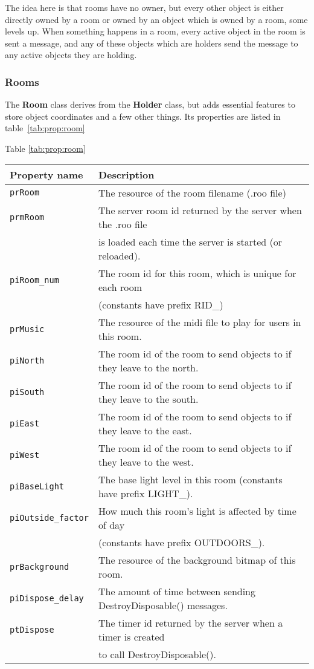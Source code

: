 \documentclass[12pt]{article}
\newcommand{\class}[1]{\textbf{#1}}
\newcommand{\prop}[1]{\texttt{#1}}
\begin{document}
The idea here is that rooms have no owner, but every other object is
either directly owned by a room or owned by an object which is owned
by a room, some levels up.  When something happens in a room, every
active object in the room is sent a message, and any of these objects
which are holders send the message to any active objects they are holding.

\subsubsection{Rooms}

The \class{Room} class derives from the \class{Holder} class, but adds
essential features to store object coordinates and a few other things.
Its properties are listed in table~\ref{tab:prop:room}
\begin{center}
Table \ref{tab:prop:room}
\begin{tabular}{||l|l||} \hline
Property name & Description 
\\ \hline \hline
\prop{prRoom} &  The resource of the room filename (.roo file)
\\ \hline
\prop{prmRoom} &  The server room id  returned by the server when the .roo
file \\
               &  is loaded each time the server is started (or reloaded).
\\ \hline
\prop{piRoom\_num} &  The room id for this room, which is unique for
each room \\
	         &  (constants have prefix RID\_)
\\ \hline
\prop{prMusic} &  The resource of the midi file to play for users in
this room.
\\ \hline
\prop{piNorth} &  The room id of the room to send objects to if they
leave to the north.
\\ \hline
\prop{piSouth} &  The room id of the room to send objects to if they
leave to the south.
\\ \hline
\prop{piEast} &  The room id of the room to send objects to if they
leave to the east.
\\ \hline
\prop{piWest} &  The room id of the room to send objects to if they
leave to the west.
\\ \hline
\prop{piBaseLight} &  The base light level in this room (constants
have prefix LIGHT\_).
\\ \hline
\prop{piOutside\_factor} &  How much this room's light is affected by
time of day \\
                   & (constants have prefix OUTDOORS\_).
\\ \hline
\prop{prBackground} & The resource of the background bitmap of this room.
\\ \hline
\prop{piDispose\_delay} &  The amount of time between sending
DestroyDisposable() messages.
\\ \hline
\prop{ptDispose} &  The timer id returned by the server when a timer
is created \\
	         & to call DestroyDisposable().
\\ \hline
\end{tabular}
\label{tab:prop:room}
\end{center}
\end{document}

